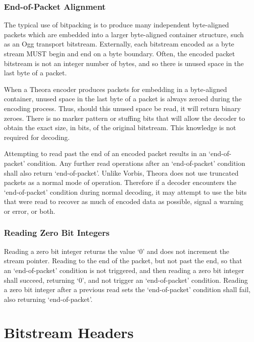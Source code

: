 \documentclass[11pt,letterpaper]{book}
\numberwithin{equation}{chapter}
\numberwithin{figure}{chapter}
\numberwithin{table}{chapter}
\begin{document}
\subsection{End-of-Packet Alignment}

The typical use of bitpacking is to produce many independent byte-aligned
 packets which are embedded into a larger byte-aligned container structure,
 such as an Ogg transport bitstream.
Externally, each bitstream encoded as a byte stream MUST begin and end on a
 byte boundary.
Often, the encoded packet bitstream is not an integer number of bytes, and so
 there is unused space in the last byte of a packet.

When a Theora encoder produces packets for embedding in a byte-aligned
 container, unused space in the last byte of a packet is always zeroed during
 the encoding process.
Thus, should this unused space be read, it will return binary zeroes.
There is no marker pattern or stuffing bits that will allow the decoder to
 obtain the exact size, in bits, of the original bitstream.
This knowledge is not required for decoding.

Attempting to read past the end of an encoded packet results in an
 `end-of-packet' condition.
Any further read operations after an `end-of-packet' condition shall also
 return `end-of-packet'.
Unlike Vorbis, Theora does not use truncated packets as a normal mode of
 operation.
Therefore if a decoder encounters the `end-of-packet' condition during normal
 decoding, it may attempt to use the bits that were read to recover as much of
 encoded data as possible, signal a warning or error, or both.

\subsection{Reading Zero Bit Integers}

Reading a zero bit integer returns the value `$0$' and does not increment
 the stream pointer.
Reading to the end of the packet, but not past the end, so that an
 `end-of-packet' condition is not triggered, and then reading a zero bit
 integer shall succeed, returning `$0$', and not trigger an `end-of-packet'
 condition.
Reading a zero bit integer after a previous read sets the `end-of-packet'
 condition shall fail, also returning `end-of-packet'.

\chapter{Bitstream Headers}
\label{sec:headers}
\end{document}
